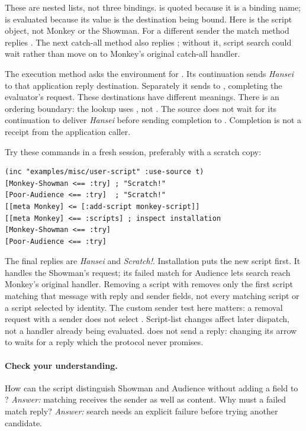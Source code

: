 These are nested lists, not three bindings.  is quoted
because it is a binding name;  is evaluated because its value
is the destination being bound. Here  is the script object,
not Monkey or the Showman.
For a different sender the match method replies .
The next catch-all  method also replies ;
without it, script search could wait rather than move on to
Monkey's original catch-all handler.


The execution method asks the environment for . Its continuation
sends \emph{Hansei} to that application reply destination.
Separately it sends  to , completing the evaluator's
request. These destinations have different meanings.
There is an ordering boundary: the lookup uses \code{<=}, not
\code{<==}. The source does not wait for its continuation to deliver
\emph{Hansei} before sending completion to .
Completion is not a receipt from the application caller.

Try these commands in a fresh session, preferably with a scratch copy:

\begin{codeblock}
\begin{lstlisting}
(inc "examples/misc/user-script" :use-source t)
[Monkey-Showman <== :try] ; "Scratch!"
[Poor-Audience <== :try]  ; "Scratch!"
[[meta Monkey] <= [:add-script monkey-script]]
[[meta Monkey] <== :scripts] ; inspect installation
[Monkey-Showman <== :try]
[Poor-Audience <== :try]
\end{lstlisting}
\end{codeblock}

The final replies are \emph{Hansei} and \emph{Scratch!}.
Installation puts the new script first. It handles the Showman's request;
its failed match for Audience lets search reach Monkey's original handler.
Removing a script with  removes only the
first script matching that message with  reply and sender fields,
not every matching script or a script selected by identity. The custom
sender test here matters: a removal request with a  sender does
not select . Script-list changes affect later dispatch,
not a handler already being evaluated.
 does not send a reply: changing its arrow to
\code{<==} waits for a reply which the protocol never promises.

\paragraph{Check your understanding.}
How can the script distinguish Showman and Audience without adding a
field to ? \emph{Answer:} matching receives the sender
as well as content. Why must a failed match reply?
\emph{Answer:} search needs an explicit failure before trying another
candidate.

